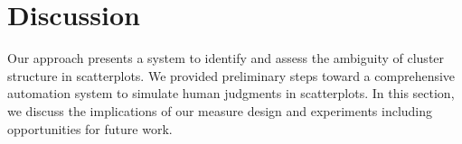 \section{Discussion}
\label{sec:discuss}

Our approach presents a system to identify and assess the ambiguity of cluster structure in scatterplots. We provided preliminary steps toward a comprehensive automation system %
to simulate human judgments 
in scatterplots. In this section, we discuss the implications of our measure design and experiments 
including opportunities for future work. 


% 
% 


